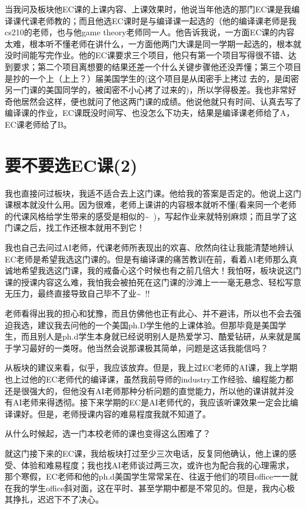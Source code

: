 \documentclass[12pt]{book}
\begin{document}
当我问及板块他EC课的上课内容、上课效果时，他说当年他选的那门EC课是我编译课代课老师教的；而且他选EC课时是与编译课一起选的（他的编译课老师是我cs210的老师，也与他game theory老师同一人。他告诉我说，一方面EC课的内容太难，根本听不懂老师在讲什么，一方面他两门大课是同一学期一起选的，根本就没时间能写完作业。他的EC课要求三个项目，他只有第一个项目写得很不错、达到要求；第二个项目离想要的结果还差一个什么关键步骤他还没弄懂；第三个项目是抄的一个上（上上？）届美国学生的(这个项目是从闺密手上拷过 去的，是闺密另一门课的美国同学的，被闺密不小心拷了过来的)，所以学得极差。我也非常好奇他居然会这样，便也就问了他这两门课的成绩。他说他就只有时间、认真去写了编译课的作业，EC课既没时间写、也没怎么下功夫，结果是编译课老师给了A，EC课老师给了B。

\section{要不要选EC课(2)}
\label{sec-14-2}

我也直接问过板块，我适不适合去上这门课。他给我的答案是否定的。他说上这门课根本就没什么用。因为很难，老师上课讲的内容根本就听不懂(看来同一个老师的代课风格给学生带来的感受是相似的\textasciitilde{}~)，写起作业来就特别麻烦；而且学了这门课之后，找工作还根本就用不到它！

我也自己去问过AI老师，代课老师所表现出的欢喜、欣然向往让我能清楚地辨认EC老师是希望我选这门课的。但是有编译课的痛苦教训在前，看着AI老师那么真诚地希望我选这门课，我的戒备心这个时候也有之前几倍大！我怕呀，板块说这门课的授课内容这么难，我怕我会被拍死在这门课的沙滩上一一毫无悬念、轻松写意无压力，最终直接导致自己毕不了业\textasciitilde{}~!!

老师看得出我的担心和犹豫，而且仿佛他也正有此心、并不避讳，所以也不会去强迫我选，建议我去问他的一个美国ph.D学生他的上课体验。但那毕竟是美国学生，而且别人是ph.d学生本身就已经说明别人是热爱学习、酷爱钻研，从来就是属于学习最好的一类呀。他当然会说那课极其简单，问题是这话我能信吗？

从板块的建议来看，似乎，我应该放弃。但是，我上过EC老师的AI课，我上学期也上过他的EC老师代的编译课，虽然我前导师的industry工作经验、编程能力都还是很强大的，但他没有AI老师那种分析问题的直觉能力，所以他的课讲就并没有AI老师来得透彻。接下来学期的EC是AI老师代的，我应该听课效果一定会比编译课好。但是，老师授课内容的难易程度我就不知道了。

从什么时候起，选一门本校老师的课也变得这么困难了？

就这门接下来的EC课，我给板块打过至少三次电话，反复同他确认，他上课的感受、体验和难易程度；我也找AI老师谈过两三次，或许也为配合我的心理需求，那个寒假，EC老师和他的ph.d美国学生常常呆在、往返于他们的项目office一一就在我的学生office斜对面，这在平时、甚至学期中都是不常见的。但是，我内心极其挣扎，迟迟下不了决心。
\end{document}
